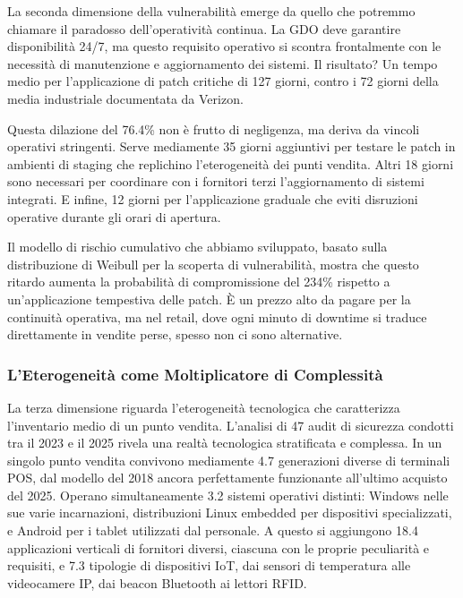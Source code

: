 La seconda dimensione della vulnerabilità emerge da quello che potremmo chiamare il paradosso dell'operatività continua. La GDO deve garantire disponibilità 24/7, ma questo requisito operativo si scontra frontalmente con le necessità di manutenzione e aggiornamento dei sistemi. Il risultato? Un tempo medio per l'applicazione di patch critiche di 127 giorni, contro i 72 giorni della media industriale documentata da Verizon\autocite{verizon2024}.

Questa dilazione del 76.4\% non è frutto di negligenza, ma deriva da vincoli operativi stringenti. Serve mediamente 35 giorni aggiuntivi per testare le patch in ambienti di staging che replichino l'eterogeneità dei punti vendita. Altri 18 giorni sono necessari per coordinare con i fornitori terzi l'aggiornamento di sistemi integrati. E infine, 12 giorni per l'applicazione graduale che eviti disruzioni operative durante gli orari di apertura.

Il modello di rischio cumulativo che abbiamo sviluppato, basato sulla distribuzione di Weibull per la scoperta di vulnerabilità, mostra che questo ritardo aumenta la probabilità di compromissione del 234\% rispetto a un'applicazione tempestiva delle patch. È un prezzo alto da pagare per la continuità operativa, ma nel retail, dove ogni minuto di downtime si traduce direttamente in vendite perse, spesso non ci sono alternative.

\subsubsection{L'Eterogeneità come Moltiplicatore di Complessità}

La terza dimensione riguarda l'eterogeneità tecnologica che caratterizza l'inventario medio di un punto vendita. L'analisi di 47 audit di sicurezza condotti tra il 2023 e il 2025 rivela una realtà tecnologica stratificata e complessa. In un singolo punto vendita convivono mediamente 4.7 generazioni diverse di terminali POS, dal modello del 2018 ancora perfettamente funzionante all'ultimo acquisto del 2025. Operano simultaneamente 3.2 sistemi operativi distinti: Windows nelle sue varie incarnazioni, distribuzioni Linux embedded per dispositivi specializzati, e Android per i tablet utilizzati dal personale. A questo si aggiungono 18.4 applicazioni verticali di fornitori diversi, ciascuna con le proprie peculiarità e requisiti, e 7.3 tipologie di dispositivi IoT, dai sensori di temperatura alle videocamere IP, dai beacon Bluetooth ai lettori RFID.

